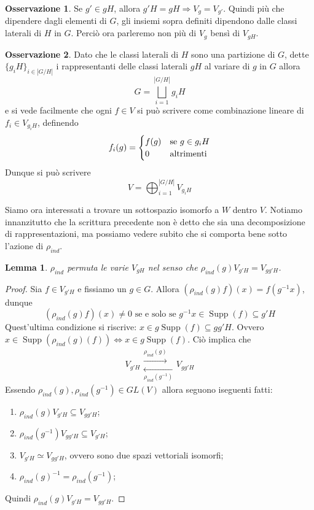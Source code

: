 \documentclass[11pt]{article}
\theoremstyle{plain}
\newtheorem{lemma}[thm]{Lemma}
\theoremstyle{definition}
\newtheorem*{rem}{Osservazione}
\theoremstyle{remark}
\DeclareMathOperator{\Supp}{Supp}
\DeclareMathOperator{\iso}{\simeq}
\begin{document}
\begin{rem} Se $g'\in gH$, allora $g'H=gH\Rightarrow V_g=V_{g'}$. Quindi più che dipendere dagli elementi di $G$, gli insiemi sopra definiti dipendono dalle classi laterali di $H$ in $G$. Perciò ora parleremo non più di $V_g$ bensì di $V_{gH}$.
\end{rem}

\begin{rem} Dato che le classi laterali di $H$ sono una partizione di $G$, dette $\{g_iH\}_{i\in |G/H|}$ i rappresentanti delle classi laterali $gH$ al variare di $g$ in $G$ allora
\[G=\bigsqcup_{i=1}^{|G/H|} g_iH\]
e si vede facilmente che ogni $f\in V$ si può scrivere come combinazione lineare di $f_i\in V_{g_iH}$, definendo
  \[f_i(g)=\begin{cases}
    f(g)& \textup{se } g\in g_iH\\
    0& \textup{altrimenti}
  \end{cases}\]
Dunque si può scrivere
\[V=\bigoplus_{i=1}^{|G/H|} V_{g_iH}\]
\end{rem}
Siamo ora interessati a trovare un sottospazio isomorfo a $W$ dentro $V$. Notiamo innanzitutto che la scrittura precedente non è detto che sia una decomposizione di rappresentazioni, ma possiamo vedere subito che si comporta bene sotto l'azione di $\rho_{ind}$.

\begin{lemma}
$\rho_{ind}$ permuta le varie $V_{gH}$ nel senso che $\rho_{ind}(g)V_{g'H}=V_{gg'H}$.
\end{lemma}

\begin{proof}
  Sia $f\in V_{g'H}$ e fissiamo un $g\in G$. Allora $(\rho_{ind}(g)f)(x)=f(g^{-1}x)$, dunque
  \[(\rho_{ind}(g)f)(x)\neq 0 \text{ se e solo se } g^{-1}x\in \Supp(f)\subseteq g'H\]
  Quest'ultima condizione si riscrive: $x\in g\Supp(f)\subseteq gg'H$.\newline
  Ovvero $x\in \Supp(\rho_{ind}(g)(f))\Leftrightarrow x\in g\Supp(f)$. Ciò implica che
  \[ V_{g'H} \begin{matrix}
    \overset{\rho_{ind}(g)}{\longrightarrow}\\
    \underset{\rho_{ind}(g^{-1})}{\longleftarrow}
  \end{matrix} V_{gg'H} \]
  Essendo $\rho_{ind}(g),\rho_{ind}(g^{-1})\in GL(V)$ allora seguono iseguenti fatti:
  \begin{enumerate}
  \item $\rho_{ind}(g)V_{g'H}\subseteq V_{gg'H}$;
  \item $\rho_{ind}(g^{-1})V_{gg'H}\subseteq V_{g'H}$;
  \item $V_{g'H}\iso V_{gg'H}$, ovvero sono due spazi vettoriali isomorfi;
  \item $\rho_{ind}(g)^{-1}=\rho_{ind}(g^{-1})$;
  \end{enumerate}
  Quindi $\rho_{ind}(g)V_{g'H}=V_{gg'H}$.
\end{proof}
\end{document}
